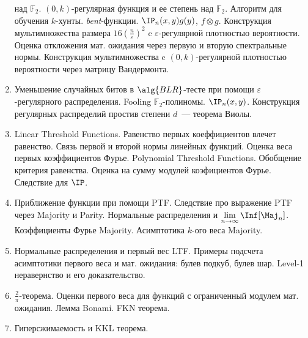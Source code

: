 \begin{enumerate}
        над $\mathbb{F}_2$. $(0, k)$-регулярная функция и ее степень над $\mathbb{F}_2$. Алгоритм для
        обучения $k$-хунты. \textit{bent}-функции. $\IP_n(x, y) g(y)$, $f \otimes g$. Конструкция
        мультимножества размера $16 (\frac{n}{\varepsilon})^2$ c $\varepsilon$-регулярной плотностью
        вероятности. Оценка откложения мат. ожидания через первую и вторую спектральные
        нормы. Конструкция мультимножества c $(0, k)$-регулярной плотностью вероятности через матрицу
        Вандермонта.
    \item Уменьшение случайных битов в $\alg{BLR}$-тесте при помощи $\varepsilon$-регулярного
        распределения. Fooling $\mathbb{F}_2$-полиномы. $\IP_n(x, y)$. Конструкция регулярных распределий
        простив степени $d$~--- теорема Виолы.
    \item Linear Threshold Functions. Равенство первых коеффициентов влечет равенство. Связь первой и
        второй нормы линейных функций. Оценка веса первых коэффициентов Фурье. Polynomial Threshold
        Functions. Обобщение критерия равенства. Оценка на сумму модулей коэфициентов Фурье. Следствие
        для $\IP$.
    \item Приближение функции при помощи PTF. Следствие про выражение PTF через Majority и
        Parity. Нормальные распределения и $\lim\limits_{n \to \infty} \Inf[\Maj_n]$. Коэффициенты Фурье
        Majority. Асимптотика $k$-ого веса Majority.
    \item Нормальные распределения и первый вес LTF. Примеры подсчета асимптотики первого веса и
        мат. ожидания: булев подкуб, булев шар. Level-1 неравернство и его доказательство.
    \item $\frac{2}{\pi}$-теорема. Оценки первого веса для функций с ограниченный модулем
        мат. ожидания. Лемма Bonami. FKN теорема.
    \item Гиперсжимаемость и KKL теорема.
\end{enumerate}

